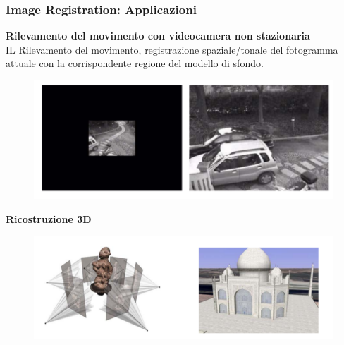 \newpage
\subsubsection{Image Registration: Applicazioni}

\textbf{Rilevamento del movimento con videocamera non stazionaria}
\\IL Rilevamento del movimento, registrazione spaziale/tonale del fotogramma attuale con la corrispondente regione del modello di
sfondo.

\begin{figure}[H]
    \centering
    \includegraphics[width=\linewidth, keepaspectratio]{capitoli/immagini/imgs/image-registration-applicazioni.png}
\end{figure}

\textbf{Ricostruzione 3D}
\begin{figure}[H]
    \centering
    \includegraphics[width=\linewidth, keepaspectratio]{capitoli/immagini/imgs/ricostruzione-3-d.png}
\end{figure}

